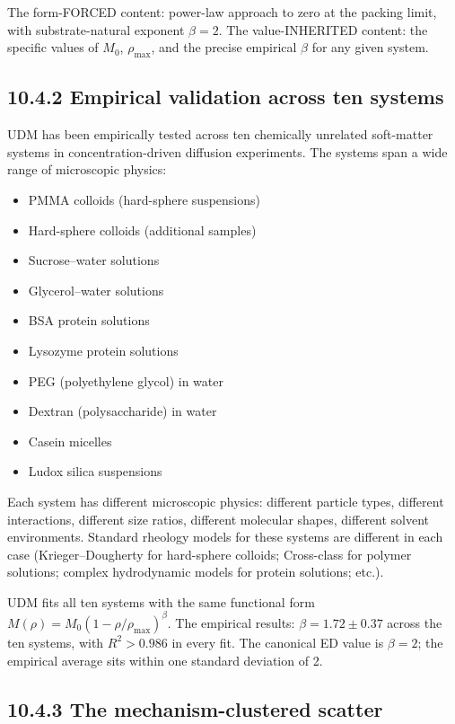 \documentclass[11pt]{book}
\begin{document}
The form-FORCED content: power-law approach to zero at the packing limit, with substrate-natural exponent $\beta = 2$. The value-INHERITED content: the specific values of $M_0$, $\rho_\mathrm{max}$, and the precise empirical $\beta$ for any given system.

\subsection{10.4.2 Empirical validation across ten systems}

UDM has been empirically tested across ten chemically unrelated soft-matter systems in concentration-driven diffusion experiments. The systems span a wide range of microscopic physics:

\begin{itemize}
\item PMMA colloids (hard-sphere suspensions)
\item Hard-sphere colloids (additional samples)
\item Sucrose–water solutions
\item Glycerol–water solutions
\item BSA protein solutions
\item Lysozyme protein solutions
\item PEG (polyethylene glycol) in water
\item Dextran (polysaccharide) in water
\item Casein micelles
\item Ludox silica suspensions
\end{itemize}

Each system has different microscopic physics: different particle types, different interactions, different size ratios, different molecular shapes, different solvent environments. Standard rheology models for these systems are different in each case (Krieger–Dougherty for hard-sphere colloids; Cross-class for polymer solutions; complex hydrodynamic models for protein solutions; etc.).

UDM fits all ten systems with the same functional form $M(\rho) = M_0(1-\rho/\rho_\mathrm{max})^\beta$. The empirical results: $\beta = 1.72 \pm 0.37$ across the ten systems, with $R^2 > 0.986$ in every fit. The canonical ED value is $\beta = 2$; the empirical average sits within one standard deviation of 2.

\subsection{10.4.3 The mechanism-clustered scatter}
\end{document}
